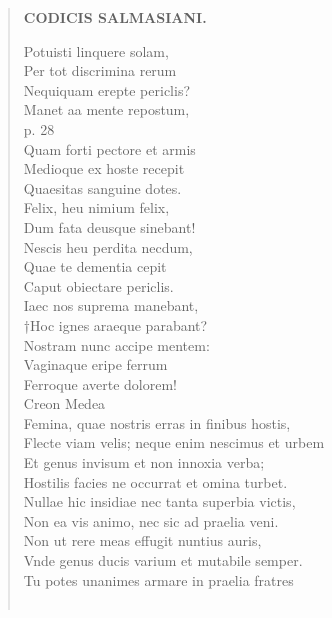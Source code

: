 \documentclass[11pt, a4paper]{report}
\begin{document}
\begin{verse}
    \begin{center} \textbf{CODICIS SALMASIANI.} \end{center} \marginpar{[63]} Potuisti linquere solam, \\ Per tot discrimina rerum \\ Nequiquam erepte periclis? \\ Manet aa mente repostum, \\ p. 28 \\ Quam forti pectore et armis \\  \lbrack Medioque ex hoste recepit \rbrack  \\ Quaesitas sanguine dotes. \\ Felix, heu nimium felix, \\ Dum fata deusque sinebant! \\ Nescis heu perdita necdum, \\ Quae te dementia cepit \\ Caput obiectare periclis. \\ Iaec nos suprema manebant, \\ †Hoc ignes araeque parabant? \\ Nostram nunc accipe mentem: \\ Vaginaque eripe ferrum \\ Ferroque averte dolorem! \\ 
                    Creon
                    Medea
                 \\ Femina, quae nostris erras in finibus hostis, \\ Flecte viam velis; neque enim nescimus et urbem \\ Et genus invisum et non innoxia verba; \\ Hostilis facies  \lbrack ne \rbrack  occurrat et omina turbet. \\ Nullae hic insidiae nec tanta superbia victis, \\ Non ea vis animo, nec sic ad praelia veni. \\ Non ut rere meas effugit nuntius auris, \\ Vnde genus ducis varium et mutabile semper. \\ Tu potes unanimes armare in praelia fratres \\ 
        ﻿\pagebreak 

\end{verse}
\end{document}
